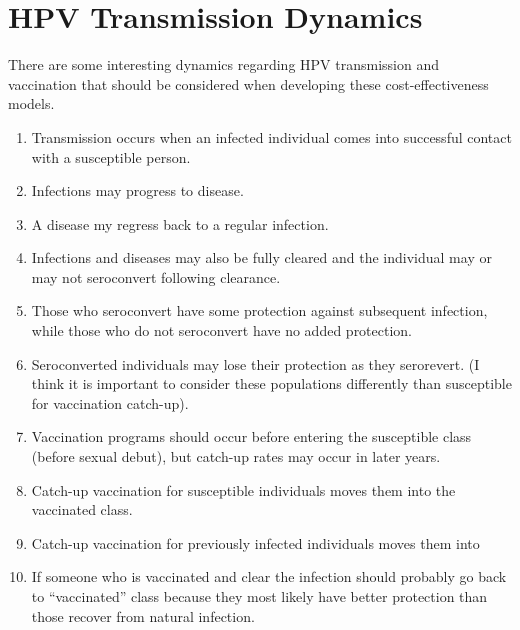 \documentclass[12pt]{article}
\begin{document}
%
%
%
%

\section{HPV Transmission Dynamics}



There are some interesting dynamics regarding HPV transmission and vaccination that should be considered when developing these cost-effectiveness models. 
\begin{enumerate}
\item Transmission occurs when an infected individual comes into successful contact with a susceptible person.  
\item Infections may progress to disease.
\item A disease my regress back to a regular infection.
\item Infections and diseases may also be fully cleared and the individual may or may not seroconvert following clearance. 
\item Those who seroconvert have some protection against subsequent infection, while those who do not seroconvert have no added protection. 
\item Seroconverted individuals may lose their protection as they serorevert.  (I think it is important to consider these populations differently than susceptible for vaccination catch-up). 
\item Vaccination programs should occur before entering the susceptible class (before sexual debut), but catch-up rates may occur in later years. 
\item Catch-up vaccination for susceptible individuals moves them into the vaccinated class.
\item Catch-up vaccination for previously infected individuals moves them into 
\item If someone who is vaccinated and clear the infection should probably go back to ``vaccinated'' class because they most likely have better protection than those recover from natural infection.  
\end{enumerate}
\end{document}
